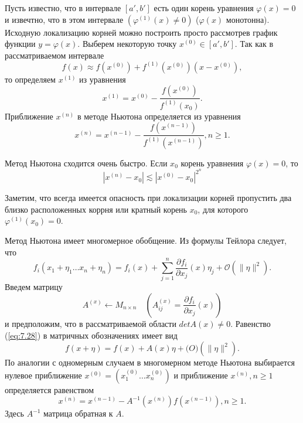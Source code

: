 Пусть известно, что в интервале $[a', b']$ есть один корень уравнения $\varphi(x) = 0$ и извечтно, что в этом интервале $(\varphi^{(1)}(x) \neq 0)$ ($\varphi(x)$ монотонна). Исходную локализацию корней можно построить просто рассмотрев график функции $y = \varphi(x)$. Выберем некоторую точку $x^{(0)} \in [a', b']$. Так как в рассматриваемом интервале 
\begin{equation} \label{eq:7.24}
	f(x) \approx f(x^{(0)}) + f^{(1)}(x^{(0)})(x-x^{(0)}),
\end{equation} 
то определяем $x^{(1)}$ из уравнения
\begin{equation} \label{eq:7.25}
	x^{(1)} = x^{(0)} - \frac{f(x^{(0)})}{f^{(1)}(x_0)}.
\end{equation}
Приближение $x^{(n)}$ в методе Ньютона определяется из уравнения
\begin{equation} \label{eq:7.26}
	x^{(n)} = x^{(n-1)} - \frac{f(x^{(n-1)})}{f^{(1)}(x^{(n-1)})}, n \geq 1.
\end{equation} 

Метод Ньютона сходится очень быстро. Если $x_0$ корень уравнения $\varphi(x) = 0$, то
\begin{equation} \label{eq:7.27}
	|x^{(n)} - x_0| \lesssim |x^{(0)} - x_0|^{2^n}
\end{equation} 

Заметим, что всегда имеется опасность при локализации корней пропустить два близко расположенных коррня или кратный корень $x_0$, для которого $\varphi^{(1)}(x_0) = 0$.

Метод Ньютона имеет многомерное обобщение. Из формулы Тейлора следует, что 
\begin{equation} \label{eq:7.28}
	f_i(x_1 + \eta_1 \dots x_n + \eta_n) = f_i(x) + \sum^n_{j=1}{\frac{\partial f_i}{\partial x_j}(x) \eta_j + \mathcal{O}(\|\eta\|^2)}.
\end{equation} 
Введем матрицу
\begin{equation} \label{eq:7.29}
	A^{(x)} \gets M_{n \times n} \quad (A^{(x)}_{ij} = \frac{\partial f_i}{\partial x_j}(x))
\end{equation} 
и предположим, что в рассматриваемой области $detA(x) \neq 0$. Равенство (\ref{eq:7.28}) в матричных обозначениях имеет вид
\begin{equation} \label{eq:7.30}
	f(x + \eta) = f(x) + A(x)\eta + \mathcal(O)(\|\eta\|^2).
\end{equation} 
По аналогии с одномерным случаем в многомерном методе Ньютона выбирается нулевое приближение $x^{(0)} = (x^{(0)}_1 \dots x^{(0)}_n)$ и приближение $x^{(n)}, n \geq 1$ определяется равенством
\begin{equation} \label{eq:7.31}
	x^{(n)} = x^{(n-1)} - A^{-1}(x^{(n)})f(x^{(n-1)}), n \geq 1.
\end{equation} 
Здесь $A^{-1}$ матрица обратная к $A$.